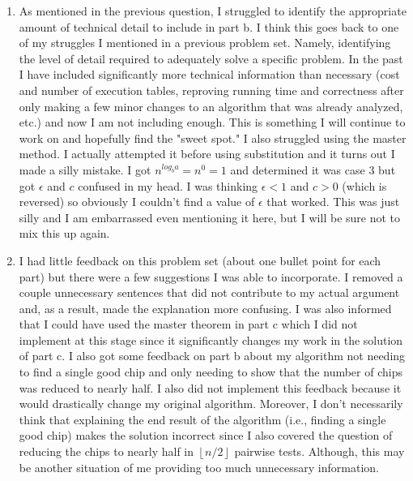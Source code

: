 \documentclass[11pt]{article}
\theoremstyle{nonumberplain}
\begin{document}
\begin{enumerate}
\item As mentioned in the previous question, I struggled to identify the appropriate amount of technical detail to include in part b. I think this goes back to one of my struggles I mentioned in a previous problem set. Namely, identifying the level of detail required to adequately solve a specific problem. In the past I have included significantly more technical information than necessary (cost and number of execution tables, reproving running time and correctness after only making a few minor changes to an algorithm that was already analyzed, etc.) and now I am not including enough. This is something I will continue to work on and hopefully find the "sweet spot." I also struggled using the master method. I actually attempted it before using substitution and it turns out I made a silly mistake. I got $n^{log_ba}=n^0=1$ and determined it was case 3 but got $\epsilon$ and $c$ confused in my head. I was thinking $\epsilon<1$ and $c>0$ (which is reversed) so obviously I couldn't find a value of $\epsilon$ that worked. This was just silly and I am embarrassed even mentioning it here, but I will be sure not to mix this up again. 
\item I had little feedback on this problem set (about one bullet point for each part) but there were a few suggestions I was able to incorporate. I removed a couple unnecessary sentences that did not contribute to my actual argument and, as a result, made the explanation more confusing. I was also informed that I could have used the master theorem in part c which I did not implement at this stage since it significantly changes my work in the solution of part c. I also got some feedback on part b about my algorithm not needing to find a single good chip and only needing to show that the number of chips was reduced to nearly half. I also did not implement this feedback because it would drastically change my original algorithm. Moreover, I don't necessarily think that explaining the end result of the algorithm (i.e., finding a single good chip) makes the solution incorrect since I also covered the question of reducing the chips to nearly half in $\left \lfloor{n/2} \right \rfloor$ pairwise tests. Although, this may be another situation of me providing too much unnecessary information. 

\end{enumerate}
\end{document}
